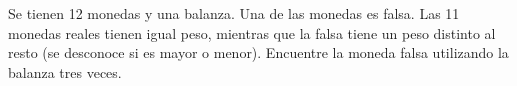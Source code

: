 Se tienen 12 monedas y una balanza. Una de las monedas es falsa. Las 11 monedas reales tienen igual peso, mientras que la falsa tiene
un peso distinto al resto (se desconoce si es mayor o menor). Encuentre la moneda falsa utilizando la balanza tres veces.